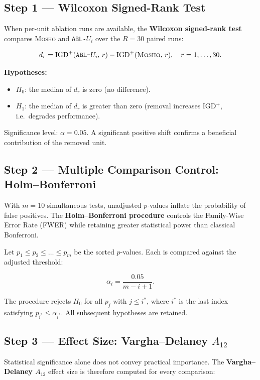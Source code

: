 \documentclass[11pt,a4paper]{article}
\newcommand{\mosho}{\textsc{Mosho}}
\newcommand{\ablof}[1]{\texttt{ABL-#1}}
\begin{document}
\subsection{Step 1 --- Wilcoxon Signed-Rank Test}
\label{sec:stat_wilcoxon}

When per-unit ablation runs are available, the \textbf{Wilcoxon
signed-rank test} compares \mosho{} and \ablof{$U_i$} over the $R=30$
paired runs:

\[
d_r = \mathrm{IGD}^+(\ablof{$U_i$},\,r)
      - \mathrm{IGD}^+(\mosho{},\,r),
\quad r = 1,\dots,30.
\]

\noindent\textbf{Hypotheses:}
\begin{itemize}[leftmargin=2em, itemsep=1pt]
  \item $H_0$: the median of $d_r$ is zero (no difference).
  \item $H_1$: the median of $d_r$ is greater than zero
        (removal increases IGD$^+$, i.e.\ degrades performance).
\end{itemize}

Significance level: $\alpha = 0.05$.  A significant positive shift
confirms a beneficial contribution of the removed unit.

\subsection{Step 2 --- Multiple Comparison Control: Holm--Bonferroni}
\label{sec:stat_holm}

With $m = 10$ simultaneous tests, unadjusted $p$-values inflate the
probability of false positives.  The \textbf{Holm--Bonferroni procedure}
controls the Family-Wise Error Rate (FWER) while retaining greater
statistical power than classical Bonferroni.

Let $p_1 \leq p_2 \leq \dots \leq p_m$ be the sorted $p$-values.
Each is compared against the adjusted threshold:

\[
\alpha_i = \frac{0.05}{m - i + 1}.
\]

The procedure rejects $H_0$ for all $p_j$ with $j \leq i^*$, where
$i^*$ is the last index satisfying $p_{i^*} \leq \alpha_{i^*}$.
All subsequent hypotheses are retained.

\subsection{Step 3 --- Effect Size: Vargha--Delaney $A_{12}$}
\label{sec:stat_a12}

Statistical significance alone does not convey practical importance.
The \textbf{Vargha--Delaney $A_{12}$} effect size is therefore computed
for every comparison:
\end{document}
